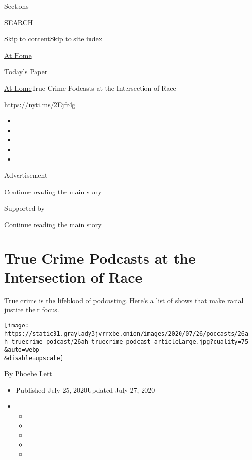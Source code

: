 Sections

SEARCH

\protect\hyperlink{site-content}{Skip to
content}\protect\hyperlink{site-index}{Skip to site index}

\href{https://www.nytimes3xbfgragh.onion/spotlight/at-home}{At Home}

\href{https://myaccount.nytimes3xbfgragh.onion/auth/login?response_type=cookie\&client_id=vi}{}

\href{https://www.nytimes3xbfgragh.onion/section/todayspaper}{Today's
Paper}

\href{/spotlight/at-home}{At Home}\textbar{}True Crime Podcasts at the
Intersection of Race

\url{https://nyti.ms/2Ejfr4g}

\begin{itemize}
\item
\item
\item
\item
\item
\end{itemize}

Advertisement

\protect\hyperlink{after-top}{Continue reading the main story}

Supported by

\protect\hyperlink{after-sponsor}{Continue reading the main story}

\hypertarget{true-crime-podcasts-at-the-intersection-of-race}{%
\section{True Crime Podcasts at the Intersection of
Race}\label{true-crime-podcasts-at-the-intersection-of-race}}

True crime is the lifeblood of podcasting. Here's a list of shows that
make racial justice their focus.

\texttt{[image: https://static01.graylady3jvrrxbe.onion/images/2020/07/26/podcasts/26ah-truecrime-podcast/26ah-truecrime-podcast-articleLarge.jpg?quality=75\\\&auto=webp\\\&disable=upscale]}

By \href{https://www.nytimes3xbfgragh.onion/by/phoebe-lett}{Phoebe Lett}

\begin{itemize}
\item
  Published July 25, 2020Updated July 27, 2020
\item
  \begin{itemize}
  \item
  \item
  \item
  \item
  \item
  \end{itemize}
\end{itemize}

